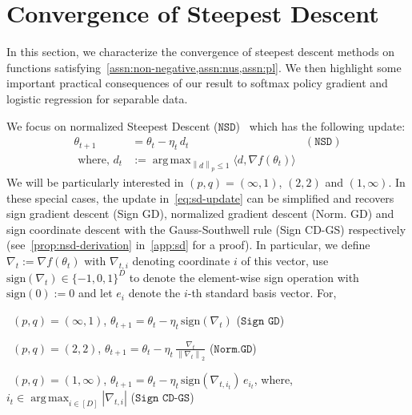 \documentclass{article}
\newcommand{\norm}[1]{\left\|#1 \right\|}
\newcommand{\tht}{\theta_t}
\newcommand{\thtt}{\theta_{t+1}}
\newcommand{\etat}{{\eta_t}}
\DeclareMathOperator*{\argmax}{arg\,max}
\newcommand{\NSD}{\texttt{NSD}}
\newcommand{\NormGD}{\texttt{Norm.GD}}
\newcommand{\SignGD}{\texttt{Sign GD}}
\newcommand{\SignCD}{\texttt{Sign CD-GS}}
\begin{document}
\section{Convergence of Steepest Descent}
\label{sec:sd}
In this section, we characterize the convergence of steepest descent methods on functions satisfying~\cref{assn:non-negative,assn:nus,assn:pl}. We then highlight some important practical consequences of our result to softmax policy gradient and logistic regression for separable data. 

We focus on normalized Steepest Descent ($\NSD$)~\citep{boyd2004convex} which has the following update:
\begin{align}
\thtt &= \tht - \etat \, d_t & (\NSD) \nonumber \\
\text{ where, } d_t & := \argmax_{\norm{d}_p \leq 1} \langle d, \nabla f(\tht) \rangle \label{eq:sd-update}
\end{align}
We will be particularly interested in $(p,q) = (\infty,1)$, $(2,2)$ and $(1, \infty)$. In these special cases, the update in~\cref{eq:sd-update} can be simplified and recovers sign gradient descent (Sign GD), normalized gradient descent (Norm. GD) and sign coordinate descent with the Gauss-Southwell rule (Sign CD-GS) respectively (see~\cref{prop:nsd-derivation} in~\cref{app:sd} for a proof). In particular, we define $\nabla_t := \nabla f(\tht)$ with $\nabla_{t,i}$ denoting coordinate $i$ of this vector, use $\text{sign}(\nabla_t) \in \{-1,0, 1\}^{D}$ to denote the element-wise sign operation with $\text{sign}(0) := 0$ and let $e_i$ denote the \(i\)-th standard basis vector. For, 

\textbullet\ $(p,q) = (\infty,1)$, $\thtt = \tht - \etat \, \text{sign}(\nabla_{t})$ ($\SignGD$)

\textbullet\ $(p,q) = (2,2)$, $\thtt = \tht - \etat \, \frac{\nabla_t}{\norm{\nabla_t}_2}$ ($\NormGD$)

\textbullet\ $(p,q) = (1,\infty)$, $\thtt = \tht - \etat \, \text{sign}(\nabla_{t,i_t}) \, e_{i_t}$, where, $i_t \in \argmax_{i \in [D]}|\nabla_{t,i}|$ ($\SignCD$)
\end{document}
